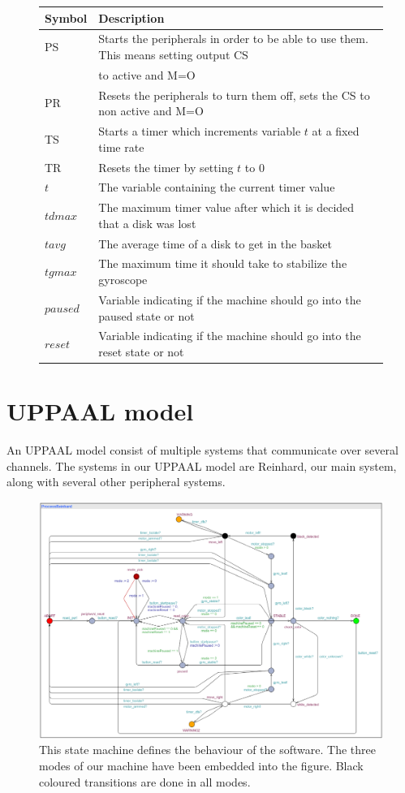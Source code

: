 \documentclass[a4paper,oneside,11pt]{article}
\begin{document}
\begin{figure}[H]
\begin{tabular}{|l|l|}
\hline
\textbf{Symbol} & \textbf{Description} \\
\hline
PS & Starts the peripherals in order to be able to use them. This means setting output CS \\
 &  to active and M=O \\
PR & Resets the peripherals to turn them off, sets the CS to non active and M=O \\
TS & Starts a timer which increments variable $t$ at a fixed time rate \\
TR & Resets the timer by setting $t$ to 0\\
$t$ & The variable containing the current timer value \\
$tdmax$ & The maximum timer value after which it is decided that a disk was lost \\
$tavg$ & The average time of a disk to get in the basket \\
$tgmax$ & The maximum time it should take to stabilize the gyroscope \\
$paused$ & Variable indicating if the machine should go into the paused state or not \\
$reset$ & Variable indicating if the machine should go into the reset state or not \\
\hline
\end{tabular}
\end{figure}

\section{UPPAAL model}
An UPPAAL model consist of multiple systems that communicate over several channels. The systems in our UPPAAL model are Reinhard, our main system, along with several other peripheral systems.

\begin{figure}[H]
	\centering
	\includegraphics[width=150mm]{mainprocess}
	\caption{This state machine defines the behaviour of the software. The three modes of our machine have been embedded into the figure. Black coloured transitions are done in all modes.}
\end{figure}
\end{document}
